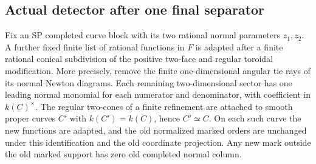 \subsection{Actual detector after one final separator}

\begin{lemma}
\label{lem:r13-sd-finite-normal-newton}
Fix an SP completed curve block with its two rational normal
parameters $z_1,z_2$.  A further fixed finite list of rational
functions in $F$ is adapted after a finite rational conical
subdivision of the positive two-face and regular toroidal
modification.  More precisely, remove the finite one-dimensional
angular tie rays of its normal Newton diagrams.  Each remaining
two-dimensional sector has one leading normal monomial for
each numerator and denominator, with coefficient in
$k(C)^\times$.  The regular two-cones of a finite refinement
are attached to smooth proper curves $C'$ with
$k(C')=k(C)$, hence $C'\simeq C$.  On each such curve the
new functions are adapted, and the old normalized marked orders
are unchanged under this identification and the old coordinate
projection.  Any new mark outside the old marked support has
zero old completed normal column.
\end{lemma}


